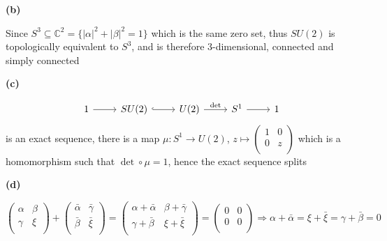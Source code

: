 \documentclass[10pt]{article}
\newcommand{\<}[1]{\langle #1 \rangle}
\begin{document}
\textbf{(b)} \par
Since $S^3\subseteq \mathbb{C}^2=\{|\alpha|^2+|\beta|^2=1\}$ which is the same zero set, thus $SU(2)$ is topologically equivalent to $S^3$, and is therefore 3-dimensional, connected and simply connected \par
\textbf{(c)} \par
$$
\begin{tikzcd}
1 \arrow[r] & SU(2) \arrow[r, hook] & U(2) \arrow[r, "\det"] & S^1 \arrow[r] & 1
\end{tikzcd}
$$ is an exact sequence, there is a map $\mu:S^1\rightarrow U(2)$, $z\mapsto\left( {\begin{array}{cc}
   1 & 0 \\
   0 & z \\
  \end{array} } \right)$ which is a homomorphism such that $\det\circ\mu=1$, hence the exact sequence splits \par
\textbf{(d)} \par
$$
\left( {\begin{array}{cc}
   \alpha &\beta  \\
    \gamma & \xi \\
  \end{array} } \right)+\left( {\begin{array}{cc}
   \bar\alpha &\bar\gamma  \\
    \bar\beta & \bar\xi \\
  \end{array} } \right)=\left( {\begin{array}{cc}
   \alpha+\bar\alpha &\beta+\bar\gamma  \\
    \gamma+\bar\beta & \xi+\bar\xi \\
  \end{array} } \right)=\left( {\begin{array}{cc}
   0 &0  \\
    0 & 0 \\
  \end{array} } \right)\Rightarrow \alpha+\bar\alpha=\xi+\bar\xi=\gamma+\bar\beta=0
$$
\end{document}
